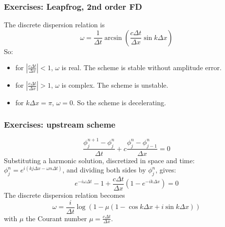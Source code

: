 \documentclass[aspectratio=43,9pt]{beamer}
\begin{document}
%
%
\begin{frame}
	\frametitle{Exercises: Leapfrog, 2nd order FD}
	The discrete dispersion relation is 
	\begin{equation*}
		\omega=\frac{1}{\Delta t}\arcsin\left(\frac{c\Delta t}{\Delta x}\sin k\Delta x\right)
	\end{equation*}
	So:
	\begin{itemize}
		\item for $\left|\frac{c\Delta t}{\Delta x}\right|<1$, $\omega$ is real. The scheme is stable without amplitude error.
		\item for $\left|\frac{c\Delta t}{\Delta x}\right|>1$, $\omega$ is complex. The scheme is unstable.
		\item for $k\Delta x=\pi$, $\omega=0$. So the scheme is decelerating.
	\end{itemize}
\end{frame}
%
%
\begin{frame}
	\frametitle{Exercises: upstream scheme}
	\begin{equation*}
		\frac{\phi_j^{n+1}-\phi_j^{n}}{\Delta t}+c\frac{\phi^n_{j}-\phi^n_{j-1}}{\Delta x}=0
	\end{equation*}
\pause
	Substituting a harmonic solution, discretized in space and time: $\phi_j^n=e^{i(kj\Delta x-\omega n \Delta t)}$, and dividing both sides by $\phi_j^n$, gives:
	\begin{equation*}
		e^{-i\omega\Delta t}-1+\frac{c\Delta t}{\Delta x}\left(1-e^{-ik\Delta x}\right)=0
	\end{equation*}
\pause
	The discrete dispersion relation becomes
	\begin{equation*}
		\omega=\frac{i}{\Delta t}\log\left(1-\mu\left(1-\cos k\Delta x+i\sin k\Delta x\right)\right)
	\end{equation*}
	with $\mu$ the Courant number $\mu=\frac{c\Delta t}{\Delta x}$.
\end{frame}
%
%
\end{document}
